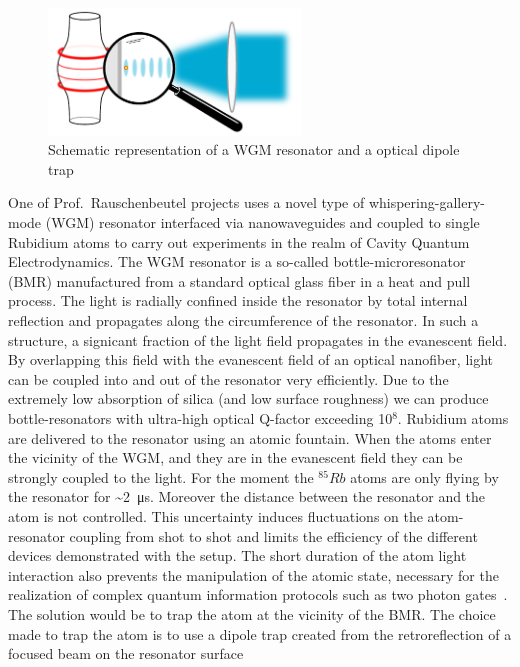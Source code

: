 \begin{figure}[hb]
    \centering
    \includegraphics[width=0.6\textwidth]{resonator_trap}
    \caption{\label{fig:resonator_trap} Schematic representation of a WGM 
    resonator and a optical dipole trap}
\end{figure}
One of Prof.\ Rauschenbeutel projects uses a novel type of whispering-gallery-mode (WGM)
resonator interfaced via nanowaveguides and coupled to single Rubidium atoms to 
carry out experiments in the realm of Cavity Quantum Electrodynamics. The WGM 
resonator is a so-called bottle-microresonator (BMR) manufactured from a standard 
optical glass fiber in a heat and pull process. The light is radially confined 
inside the resonator by total internal reflection and propagates along the 
circumference of the resonator. In such a structure, a signicant fraction of the 
light field propagates in the evanescent field. By overlapping this field with 
the evanescent field of an optical nanofiber, light can be coupled into and out 
of the resonator very efficiently. Due to the extremely low absorption of silica 
(and low surface roughness) we can produce bottle-resonators with ultra-high 
optical Q-factor exceeding 10\(^{8}\). Rubidium atoms are delivered to the 
resonator using an atomic fountain. When the atoms enter the vicinity of the WGM, 
and they are in the evanescent field they can be strongly coupled to the light. 
For the moment the \(^{85}Rb\) atoms are only flying by the resonator for 
\textasciitilde{}\SI{2}{\micro\second}. Moreover the distance between the 
resonator and the atom is not controlled. This uncertainty induces fluctuations
on the atom-resonator coupling from shot to shot and limits the efficiency of the
different devices demonstrated with the setup. The short duration of the atom
light interaction also prevents the manipulation of the atomic state, necessary
for the realization of complex quantum information protocols such as two photon
gates~\cite{PhysRevLett.92.127902}. The solution would be to trap the atom at the
vicinity of the BMR\@. The choice made to trap the atom is to use a dipole trap 
created from the retroreflection of a focused beam on the resonator surface 
